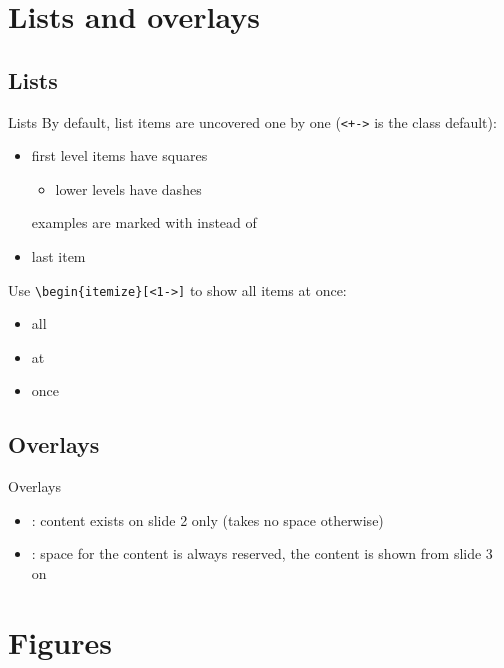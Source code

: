 \section{Lists and overlays}
\subsection{Lists}
\begin{frame}{Lists}
	By default, list items are uncovered one by one (\texttt{<+->} is the class default):
	\begin{itemize}
		\item first level items have squares
		\begin{itemize}
			\item lower levels have dashes
		\end{itemize}
		\example examples are marked with  instead of 
		\item last item
	\end{itemize}
	\bigskip
	Use \texttt{\textbackslash begin\{itemize\}[<1->]} to show all items at once:
	\begin{itemize}[<1->]
		\item all
		\item at
		\item once
	\end{itemize}
\end{frame}
%
\subsection{Overlays}
\begin{frame}{Overlays}
	\begin{itemize}[<1->]
		\item {}: content exists on slide 2 only (takes no space otherwise)
		\item {}: space for the content is always reserved, the content is shown from slide 3 on
	\end{itemize}
	\bigskip
\end{frame}
%
%
\section{Figures}
